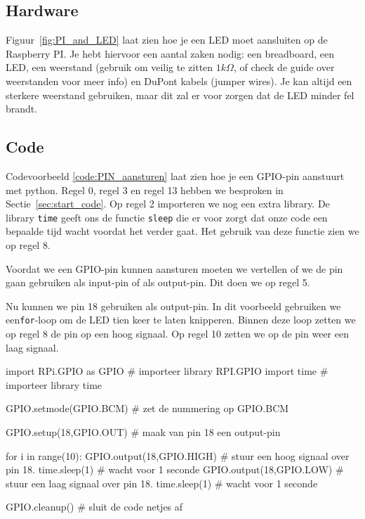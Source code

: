 \documentclass{guide}
\begin{document}
\subsection{Hardware}
Figuur~\ref{fig:PI_and_LED} laat zien hoe je een LED moet aansluiten op de Raspberry PI. Je hebt hiervoor een aantal zaken nodig: een breadboard, een LED, een weerstand (gebruik om veilig te zitten $1k\Omega$, of check de guide over weerstanden voor meer info)  en DuPont kabels (jumper wires). Je kan altijd een sterkere weerstand gebruiken, maar dit zal er voor zorgen dat de LED minder fel brandt.

\subsection{Code}
Codevoorbeeld \ref{code:PIN_aansturen} laat zien hoe je een GPIO-pin aanstuurt met python. Regel 0, regel 3 en regel 13 hebben we besproken in Sectie~\ref{sec:start_code}. Op regel 2 importeren we nog een extra library. De library \texttt{time} geeft ons de functie \texttt{sleep} die er voor zorgt dat onze code een bepaalde tijd wacht voordat het verder gaat. Het gebruik van deze functie zien we op regel 8.

Voordat we een GPIO-pin kunnen aansturen moeten we vertellen of we de pin gaan gebruiken als input-pin of als output-pin. Dit doen we op regel 5.

Nu kunnen we pin 18 gebruiken als output-pin. In dit voorbeeld gebruiken we een\texttt{for}-loop om de LED tien keer te laten knipperen. Binnen deze loop zetten we op regel 8 de pin op een hoog signaal. Op regel 10 zetten we op de pin weer een laag signaal.

\begin{python}[caption={De GPIO library inladen}, label=code:PIN_aansturen]
import RPi.GPIO as GPIO     # importeer library RPI.GPIO
import time                 # importeer library time

GPIO.setmode(GPIO.BCM)      # zet de nummering op GPIO.BCM

GPIO.setup(18,GPIO.OUT)     # maak van pin 18 een output-pin

for i in range(10):
  GPIO.output(18,GPIO.HIGH) # stuur een hoog signaal over pin 18.
  time.sleep(1)             # wacht voor 1 seconde
  GPIO.output(18,GPIO.LOW)  # stuur een laag signaal over pin 18.
    time.sleep(1)           # wacht voor 1 seconde

GPIO.cleanup()              # sluit de code netjes af
\end{python}
\end{document}
